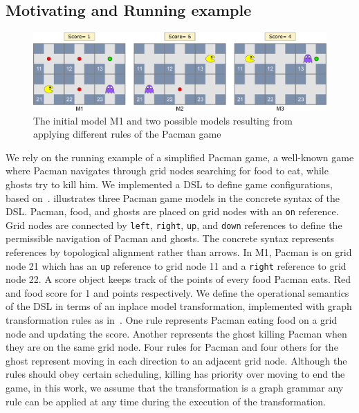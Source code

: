 \subsection{Motivating and Running example}\label{sec:example}

\begin{figure}
    \centering
    \includegraphics[width=\linewidth]{images/pacman_example}
    \caption{The initial model M1 and two possible models resulting from applying different rules of the Pacman game}
    \label{fig:example}
\end{figure}
%
We rely on the running example of a simplified Pacman game, a well-known game where Pacman navigates through grid nodes searching for food to eat, while ghosts try to kill him.
We implemented a DSL to define game configurations, based on~\cite{Syriani2013a}.
 illustrates three Pacman game models in the concrete syntax of the DSL.
Pacman, food, and ghosts are placed on grid nodes with an \texttt{on} reference.
Grid nodes are connected by \texttt{left}, \texttt{right}, \texttt{up}, and \texttt{down} references to define the permissible navigation of Pacman and ghosts.
The concrete syntax represents references by topological alignment rather than arrows.
In M1, Pacman is on grid node 21 which has an \texttt{up} reference to grid node 11 and a \texttt{right} reference to grid node 22.
A score object keeps track of the points of every food Pacman eats.
Red and food score for 1 and points respectively.
We define the operational semantics of the DSL in terms of an inplace model transformation, implemented with graph transformation rules as in~\cite{Syriani2013a}.
One rule represents Pacman eating food on a grid node and updating the score.
Another represents the ghost killing Pacman when they are on the same grid node.
Four rules for Pacman and four others for the ghost represent moving in each direction to an adjacent grid node.
Although the rules should obey certain scheduling, \eg killing has priority over moving to end the game, in this work, we assume that the transformation is a graph grammar \ie any rule can be applied at any time during the execution of the transformation.

